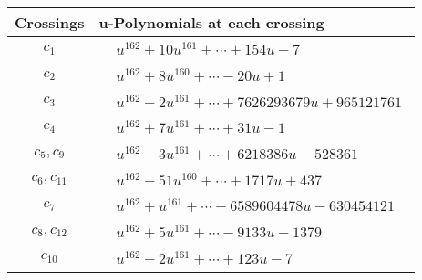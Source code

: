 \documentclass[1p]{elsarticle_modified}
\theoremstyle{definition}
\begin{document}
\begin{tabular}{m{50pt}|m{274pt}}
Crossings & \hspace{64pt}u-Polynomials at each crossing \\
\hline $$\begin{aligned}c_{1}\end{aligned}$$&$\begin{aligned}
&u^{162}+10 u^{161}+\cdots+154 u-7
\end{aligned}$\\
\hline $$\begin{aligned}c_{2}\end{aligned}$$&$\begin{aligned}
&u^{162}+8 u^{160}+\cdots-20 u+1
\end{aligned}$\\
\hline $$\begin{aligned}c_{3}\end{aligned}$$&$\begin{aligned}
&u^{162}-2 u^{161}+\cdots+7626293679 u+965121761
\end{aligned}$\\
\hline $$\begin{aligned}c_{4}\end{aligned}$$&$\begin{aligned}
&u^{162}+7 u^{161}+\cdots+31 u-1
\end{aligned}$\\
\hline $$\begin{aligned}c_{5},c_{9}\end{aligned}$$&$\begin{aligned}
&u^{162}-3 u^{161}+\cdots+6218386 u-528361
\end{aligned}$\\
\hline $$\begin{aligned}c_{6},c_{11}\end{aligned}$$&$\begin{aligned}
&u^{162}-51 u^{160}+\cdots+1717 u+437
\end{aligned}$\\
\hline $$\begin{aligned}c_{7}\end{aligned}$$&$\begin{aligned}
&u^{162}+u^{161}+\cdots-6589604478 u-630454121
\end{aligned}$\\
\hline $$\begin{aligned}c_{8},c_{12}\end{aligned}$$&$\begin{aligned}
&u^{162}+5 u^{161}+\cdots-9133 u-1379
\end{aligned}$\\
\hline $$\begin{aligned}c_{10}\end{aligned}$$&$\begin{aligned}
&u^{162}-2 u^{161}+\cdots+123 u-7
\end{aligned}$\\
\hline
\end{tabular}\\~\\
\end{document}
